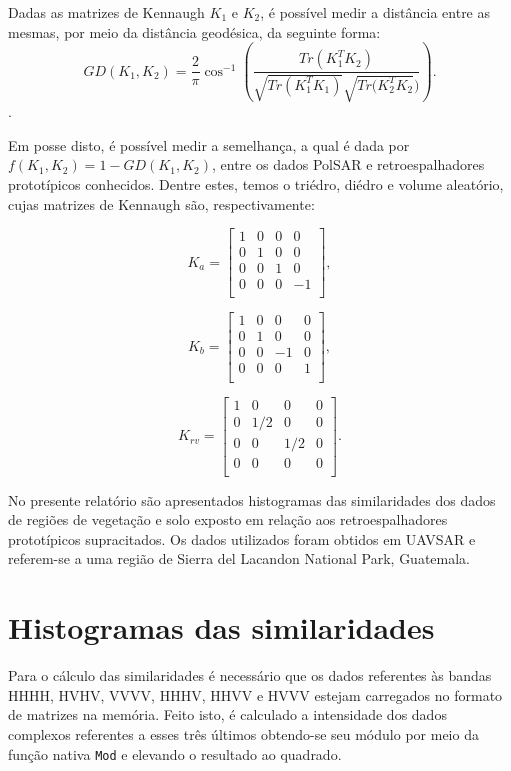 \documentclass[12pt]{article}
\begin{document}
Dadas as matrizes de Kennaugh $K_1$ e $K_2$, é possível medir a distância entre as mesmas, por meio da distância geodésica, da seguinte forma:
\begin{displaymath}
GD(K_1, K_2) = \frac{2}{\pi} \cos^{-1} \left(\frac{Tr(K_1^T K_2)}{\sqrt{Tr(K_1^T K_1)} \sqrt{Tr(K_2^T K_2})} \right).
\end{displaymath}.

Em posse disto, é possível medir a semelhança, a qual é dada por $f(K_1, K_2) = 1 - GD(K_1, K_2)$, entre os dados PolSAR e retroespalhadores prototípicos conhecidos. Dentre estes, temos o triédro, diédro e volume aleatório, cujas matrizes de Kennaugh são, respectivamente:

\[K_a =
\begin{bmatrix}
1 & 0 & 0 & 0\\
0 & 1 & 0 & 0\\
0 & 0 & 1 & 0\\
0 & 0 & 0 & -1\\
\end{bmatrix}
,\]

\[K_b =
\begin{bmatrix}
1 & 0 & 0 & 0\\
0 & 1 & 0 & 0\\
0 & 0 & -1 & 0\\
0 & 0 & 0 & 1\\
\end{bmatrix}
,\]

\[K_{rv} =
\begin{bmatrix}
1 & 0 & 0 & 0\\
0 & 1/2 & 0 & 0\\
0 & 0 & 1/2 & 0\\
0 & 0 & 0 & 0\\
\end{bmatrix}
.\]

No presente relatório são apresentados histogramas das similaridades dos dados de regiões de vegetação e solo exposto em relação aos retroespalhadores prototípicos supracitados. Os dados utilizados foram obtidos em UAVSAR e referem-se a uma região de Sierra del Lacandon National Park, Guatemala.

\section{Histogramas das similaridades}

Para o cálculo das similaridades é necessário que os dados referentes às bandas HHHH, HVHV, VVVV, HHHV, HHVV e HVVV estejam carregados no formato de matrizes na memória. Feito isto, é calculado a intensidade dos dados complexos referentes a esses três últimos obtendo-se seu módulo por meio da função nativa \texttt{Mod} e elevando o resultado ao quadrado. 
\end{document}
